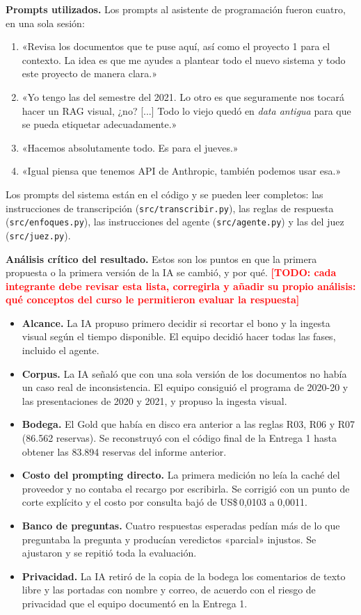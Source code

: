 \documentclass[11pt,letterpaper]{article}
\newcommand{\pendiente}[1]{\textcolor{red}{\textbf{[TODO: #1]}}}
\newcommand{\cod}[1]{\texttt{\small #1}}
\begin{document}
\textbf{Prompts utilizados.} Los prompts al asistente de programación fueron cuatro, en una sola sesión:

\begin{enumerate}[leftmargin=1.5em,itemsep=2pt]
\item «Revisa los documentos que te puse aquí, así como el proyecto 1 para el contexto. La idea es que me ayudes a plantear todo el nuevo sistema y todo este proyecto de manera clara.»
\item «Yo tengo las del semestre del 2021. Lo otro es que seguramente nos tocará hacer un RAG visual, ¿no? [...] Todo lo viejo quedó en \emph{data antigua} para que se pueda etiquetar adecuadamente.»
\item «Hacemos absolutamente todo. Es para el jueves.»
\item «Igual piensa que tenemos API de Anthropic, también podemos usar esa.»
\end{enumerate}

Los prompts del sistema están en el código y se pueden leer completos: las instrucciones de transcripción (\cod{src/transcribir.py}), las reglas de respuesta (\cod{src/enfoques.py}), las instrucciones del agente (\cod{src/agente.py}) y las del juez (\cod{src/juez.py}).

\textbf{Análisis crítico del resultado.} Estos son los puntos en que la primera propuesta o la primera versión de la IA se cambió, y por qué. \pendiente{cada integrante debe revisar esta lista, corregirla y añadir su propio análisis: qué conceptos del curso le permitieron evaluar la respuesta}

\begin{itemize}[leftmargin=1.5em,itemsep=2pt]
\item \textbf{Alcance.} La IA propuso primero decidir si recortar el bono y la ingesta visual según el tiempo disponible. El equipo decidió hacer todas las fases, incluido el agente.
\item \textbf{Corpus.} La IA señaló que con una sola versión de los documentos no había un caso real de inconsistencia. El equipo consiguió el programa de 2020-20 y las presentaciones de 2020 y 2021, y propuso la ingesta visual.
\item \textbf{Bodega.} El Gold que había en disco era anterior a las reglas R03, R06 y R07 (86.562 reservas). Se reconstruyó con el código final de la Entrega 1 hasta obtener las 83.894 reservas del informe anterior.
\item \textbf{Costo del prompting directo.} La primera medición no leía la caché del proveedor y no contaba el recargo por escribirla. Se corrigió con un punto de corte explícito y el costo por consulta bajó de US\$\,0,0103 a 0,0011.
\item \textbf{Banco de preguntas.} Cuatro respuestas esperadas pedían más de lo que preguntaba la pregunta y producían veredictos «parcial» injustos. Se ajustaron y se repitió toda la evaluación.
\item \textbf{Privacidad.} La IA retiró de la copia de la bodega los comentarios de texto libre y las portadas con nombre y correo, de acuerdo con el riesgo de privacidad que el equipo documentó en la Entrega 1.
\end{itemize}
\end{document}
